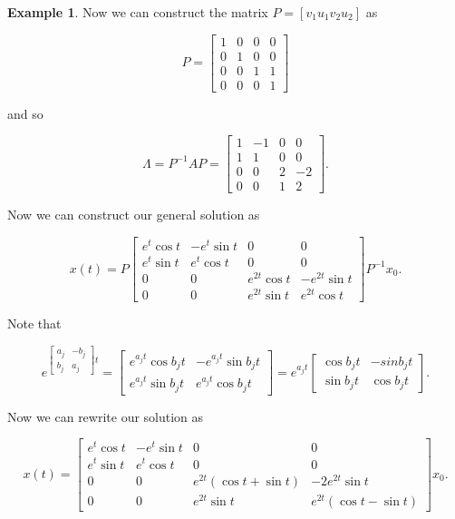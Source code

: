 \documentclass[12pt]{article}
\theoremstyle{definition}
\newtheorem*{example}{Example}
\begin{document}
\begin{example}
Now we can construct the matrix $P = [v_1 u_1 v_2 u_2]$ as

\[
P =
\begin{bmatrix}
1 & 0 & 0 & 0 \\
0 & 1 & 0 & 0 \\
0 & 0 & 1 & 1 \\
0 & 0 & 0 & 1
\end{bmatrix}
\]

and so

\[
\Lambda = P^{-1}AP =
\begin{bmatrix}
1 & -1 & 0 & 0 \\
1 & 1 & 0 & 0 \\
0 & 0 & 2 & -2 \\
0 & 0 & 1 & 2 
\end{bmatrix}.
\]

Now we can construct our general solution as

\[
x(t) = P
\begin{bmatrix}
e^t \cos t & -e^t \sin t & 0 & 0 \\
e^t \sin t & e^t \cos t & 0 & 0 \\
0 & 0 & e^{2t}\cos t & -e^{2t}\sin t \\
0 & 0 & e^{2t}\sin t & e^{2t}\cos t
\end{bmatrix}
P^{-1} x_0.
\]

Note that 

\[
e^{\begin{bmatrix}
a_j & -b_j \\
b_j & a_j
\end{bmatrix}
t
}
=
\begin{bmatrix}
e^{a_j t} \cos b_j t & -e^{a_j t} \sin b_j t \\
e^{a_j t} \sin b_j t & e^{a_j t} \cos b_j t
\end{bmatrix}
= e^{a_j t}
\begin{bmatrix}
\cos b_j t & -sin b_j t \\
\sin b_j t & \cos b_j t
\end{bmatrix}.
\]

Now we can rewrite our solution as

\[
x(t) =
\begin{bmatrix}
e^t \cos t & -e^t \sin t & 0 & 0 \\
e^t \sin t & e^t \cos t & 0 & 0 \\
0 & 0 & e^{2t} (\cos t + \sin t) & -2 e^{2t} \sin t \\
0 & 0 & e^{2t} \sin t & e^{2t} (\cos t - \sin t)
\end{bmatrix}
x_0.
\]
\end{example}
\end{document}
